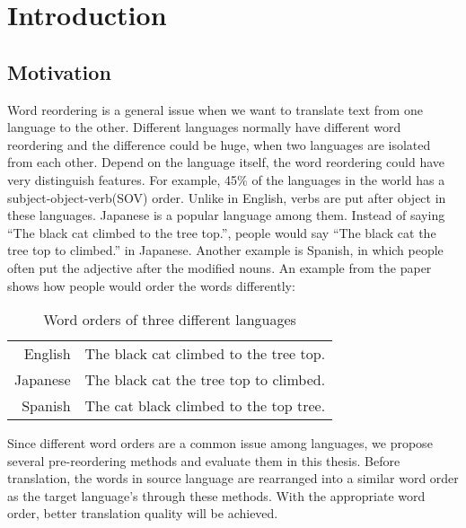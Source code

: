 
\chapter{Introduction}
\label{ch:Introduction}

\section{Motivation}
\label{ch:Introduction:sec:Motivation}

Word reordering is a general issue when we want to translate text from one language to the other. Different languages normally have different word reordering and the difference could be huge, when two languages are isolated from each other. Depend on the language itself, the word reordering could have very distinguish features. For example, 45\% of the languages in the world has a subject-object-verb(SOV) order. Unlike in English, verbs are put after object in these languages. Japanese is a popular language among them. Instead of saying ``The black cat climbed to the tree top.'', people would say ``The black cat the tree top to climbed.'' in Japanese. Another example is Spanish, in which people often put the adjective after the modified nouns. An example from the paper \cite{google} shows how people would order the words differently:

\begin{table}[H]
\centering
\begin{tabular}{| r l |}
\hline 
English & The black cat climbed to the tree top. \Hstrut \Tstrut \\
\Hstrut Japanese & The black cat the tree top to climbed. \\
Spanish & The cat black climbed to the top tree. \Bstrut \\
\hline
\end{tabular}
\caption{Word orders of three different languages}
\end{table}

Since different word orders are a common issue among languages, we propose several pre-reordering methods and evaluate them in this thesis. Before translation, the words in source language are rearranged into a similar word order as the target language's through these methods. With the appropriate word order, better translation quality will be achieved.

